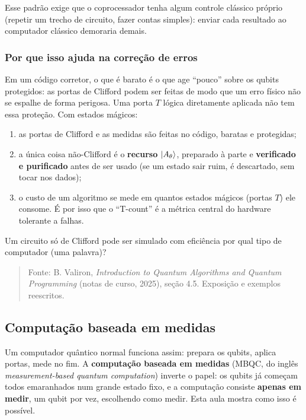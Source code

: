 Esse padrão exige que o coprocessador tenha algum controle clássico próprio (repetir um trecho de circuito, fazer contas simples): enviar cada resultado ao computador clássico demoraria demais.

\subsubsection{Por que isso ajuda na correção de erros}\label{por-que-isso-ajuda-na-correuxe7uxe3o-de-erros}

Em um código corretor, o que é barato é o que age ``pouco'' sobre os qubits protegidos: as portas de Clifford podem ser feitas de modo que um erro físico não se espalhe de forma perigosa. Uma porta \(T\) lógica diretamente aplicada não tem essa proteção. Com estados mágicos:

\begin{enumerate}
\def\labelenumi{\arabic{enumi}.}
\tightlist
\item
  as portas de Clifford e as medidas são feitas no código, baratas e protegidas;
\item
  a única coisa não-Clifford é o \textbf{recurso} \(\left|{A_\theta}\right>\), preparado à parte e \textbf{verificado e purificado} antes de ser usado (se um estado sair ruim, é descartado, sem tocar nos dados);
\item
  o custo de um algoritmo se mede em quantos estados mágicos (portas \(T\)) ele consome. É por isso que o ``T-count'' é a métrica central do hardware tolerante a falhas.
\end{enumerate}

Um circuito só de Clifford pode ser simulado com eficiência por qual tipo de computador (uma palavra)?

\begin{quote}
Fonte: B. Valiron, \emph{Introduction to Quantum Algorithms and Quantum Programming} (notas de curso, 2025), seção 4.5. Exposição e exemplos reescritos.
\end{quote}

\subsection{Computação baseada em medidas}
Um computador quântico normal funciona assim: prepara os qubits, aplica portas, mede no fim. A \textbf{computação baseada em medidas} (MBQC, do inglês \emph{measurement-based quantum computation}) inverte o papel: os qubits já começam todos emaranhados num grande estado fixo, e a computação consiste \textbf{apenas em medir}, um qubit por vez, escolhendo como medir. Esta aula mostra como isso é possível.

